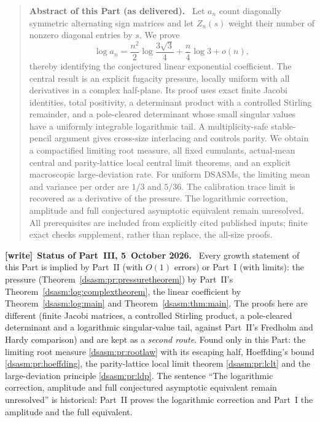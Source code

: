 \documentclass[11pt,letterpaper]{article}
\theoremstyle{remark}\newtheorem{remark}[theorem]{Remark}
\newenvironment{writenote}[1][]{\par\smallskip\begingroup\small
 \noindent\textbf{[write]}\if\relax\detokenize{#1}\relax\else~\textbf{#1.}\fi\ }%
 {\par\endgroup\smallskip}
\newenvironment{partabstract}{\begin{quote}\small\noindent\textbf{Abstract of this Part (as delivered).}\ }{\end{quote}}
\begin{document}
\begin{partabstract}
Let $a_n$ count diagonally symmetric alternating sign matrices and let
$Z_n(s)$ weight their number of nonzero diagonal entries by $s$.
We prove
\[
 \log a_n=\frac{n^2}{2}\log\frac{3\sqrt3}{4}
                    +\frac n4\log3+o(n),
\]
thereby identifying the conjectured linear exponential coefficient.
The central result is an explicit fugacity pressure, locally uniform
with all derivatives in a complex half-plane. Its proof uses exact
finite Jacobi identities, total positivity, a determinant product with
a controlled Stirling remainder, and a pole-cleared determinant whose
small singular values have a uniformly integrable logarithmic tail.
A multiplicity-safe stable-pencil argument gives cross-size interlacing
and controls parity. We obtain a compactified limiting root measure,
all fixed cumulants, actual-mean central and parity-lattice local
central limit theorems, and an explicit macroscopic large-deviation
rate. For uniform DSASMs, the limiting mean and variance per order
are $1/3$ and $5/36$. The calibration trace limit is recovered as a
derivative of the pressure. The logarithmic correction, amplitude and
full conjectured asymptotic equivalent remain unresolved.
All prerequisites are included from explicitly cited published inputs;
finite exact checks supplement, rather than replace, the all-size proofs.
\end{partabstract}
\begin{writenote}[Status of Part~III, 5~October 2026]
Every growth statement of this Part is implied by Part~II (with $O(1)$ errors) or Part~I (with limits): the pressure (Theorem~\ref{dsasm:pr:pressuretheorem}) by Part~II's Theorem~\ref{dsasm:log:complextheorem}, the linear coefficient by Theorem~\ref{dsasm:log:main} and Theorem~\ref{dsasm:thm:main}. The proofs here are different (finite Jacobi matrices, a controlled Stirling product, a pole-cleared determinant and a logarithmic singular-value tail, against Part~II's Fredholm and Hardy comparison) and are kept as a \emph{second route}. Found only in this Part: the limiting root measure \eqref{dsasm:pr:rootlaw} with its escaping half, Hoeffding's bound \eqref{dsasm:pr:hoeffding}, the parity-lattice local limit theorem \eqref{dsasm:pr:lclt} and the large-deviation principle \eqref{dsasm:pr:ldp}. The sentence ``The logarithmic correction, amplitude and full conjectured asymptotic equivalent remain unresolved'' is historical: Part~II proves the logarithmic correction and Part~I the amplitude and the full equivalent.
\end{writenote}
\end{document}
